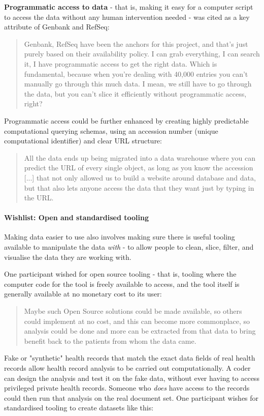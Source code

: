 \documentclass{CUP-JNL-DAP}%
\begin{document}
\textbf{Programmatic access to data} - that is, making it easy for a computer script to access the data without any human intervention needed - was cited as a key attribute of Genbank and RefSeq: 

\blockquote{Genbank, RefSeq have been the anchors for this project, and that's just purely based on their availability policy. I can grab everything, I can search it, I have programmatic access to get the right data. Which is fundamental, because when you're dealing with 40,000 entries you can't manually go through this much data. I mean, we still have to go through the data, but you can't slice it efficiently without programmatic access, right?}

Programmatic access could be further enhanced by creating highly predictable computational querying schemas, using an accession number (unique computational identifier) and clear URL structure: 

\blockquote{All the data ends up being migrated into a data warehouse where you can predict the URL of every single object, as long as you know the accession [...] that not only allowed us to build a website around database and data, but that also lets anyone access the data that they want just by typing in the URL.}

\paragraph{Wishlist: Open and standardised tooling}
Making data easier to use also involves making sure there is useful tooling available to manipulate the data \textit{with} - to allow people to clean, slice, filter, and visualise the data they are working with.

One participant wished for open source tooling - that is, tooling where the computer code for the tool is freely available to access, and the tool itself is generally available at no monetary cost to its user: 

\blockquote{Maybe such Open Source solutions could be made available, so others could implement at no cost, and this can become more commonplace, so analysis could be done and more can be extracted from that data to bring benefit back to the patients from whom the data came.}

Fake or "synthetic" health records that match the exact data fields of real health records allow health record analysis to be carried out computationally. A coder can design the analysis and test it on the fake data, without ever having to access privileged private health records. Someone who \textit{does} have access to the records could then run that analysis on the real document set. One participant wishes for standardised tooling to create datasets like this: 
\end{document}
